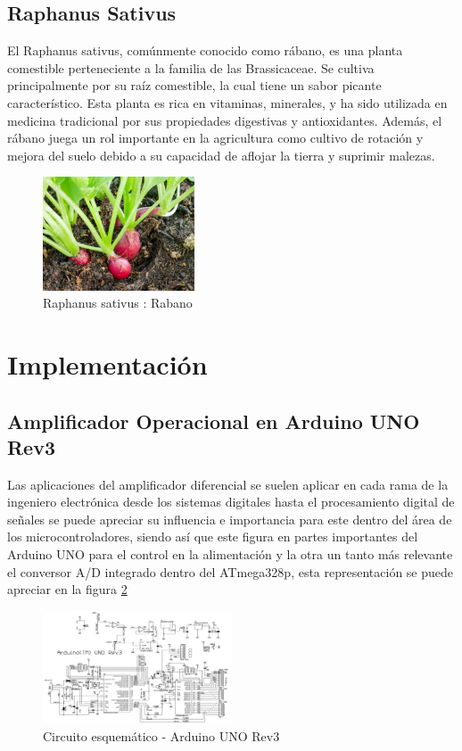 \documentclass[conference]{IEEEtran}
\begin{document}
	\subsection{Raphanus Sativus}
	El Raphanus sativus, comúnmente conocido como rábano, es una planta comestible perteneciente a la familia de las Brassicaceae. Se cultiva principalmente por su raíz comestible, la cual tiene un sabor picante característico. Esta planta es rica en vitaminas, minerales, y ha sido utilizada en medicina tradicional por sus propiedades digestivas y antioxidantes. Además, el rábano juega un rol importante en la agricultura como cultivo de rotación y mejora del suelo debido a su capacidad de aflojar la tierra y suprimir malezas.
	
	\begin{figure}[h]
		\centering
		\includegraphics[width=0.4\textwidth]{media/raphanos.jpg}
		\caption{Raphanus sativus : Rabano}
		\label{fig:raphanus-sativus}
	\end{figure}
	
	
	\section{Implementación}
	
	\subsection{Amplificador Operacional en Arduino UNO Rev3}
	Las aplicaciones del amplificador diferencial se suelen aplicar en cada rama de la ingeniero electrónica desde los sistemas digitales hasta el procesamiento digital de señales se puede apreciar su influencia e importancia para este dentro del área de los microcontroladores, siendo así que este figura en partes importantes del Arduino UNO para el control en la alimentación y la otra un tanto más relevante el conversor A/D integrado dentro del ATmega328p, esta representación se puede apreciar en la figura \ref{fig:arduino-uno-esquematico}
	
	\begin{figure}[h]
		\centering
		\includegraphics[width=0.5\textwidth]{media/arduino-uno-esquema}
		\caption{Circuito esquemático - Arduino UNO Rev3}
		\label{fig:arduino-uno-esquematico}
	\end{figure}
	
\end{document}
